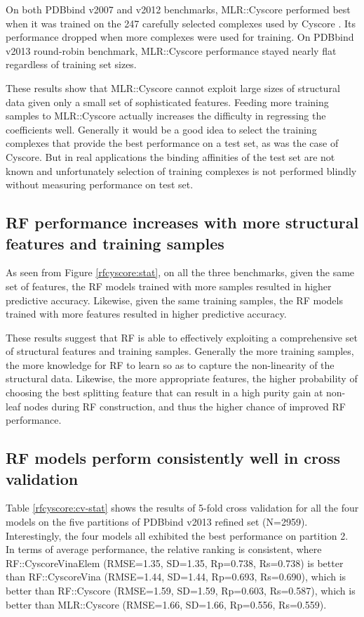 On both PDBbind v2007 and v2012 benchmarks, MLR::Cyscore performed best when it was trained on the 247 carefully selected complexes used by Cyscore \citep{1372}. Its performance dropped when more complexes were used for training. On PDBbind v2013 round-robin benchmark, MLR::Cyscore performance stayed nearly flat regardless of training set sizes.

These results show that MLR::Cyscore cannot exploit large sizes of structural data given only a small set of sophisticated features. Feeding more training samples to MLR::Cyscore actually increases the difficulty in regressing the coefficients well. Generally it would be a good idea to select the training complexes that provide the best performance on a test set, as was the case of Cyscore. But in real applications the binding affinities of the test set are not known and unfortunately selection of training complexes is not performed blindly without measuring performance on test set.

\subsection{RF performance increases with more structural features and training samples}

As seen from Figure \ref{rfcyscore:stat}, on all the three benchmarks, given the same set of features, the RF models trained with more samples resulted in higher predictive accuracy. Likewise, given the same training samples, the RF models trained with more features resulted in higher predictive accuracy.

These results suggest that RF is able to effectively exploiting a comprehensive set of structural features and training samples. Generally the more training samples, the more knowledge for RF to learn so as to capture the non-linearity of the structural data. Likewise, the more appropriate features, the higher probability of choosing the best splitting feature that can result in a high purity gain at non-leaf nodes during RF construction, and thus the higher chance of improved RF performance.

\subsection{RF models perform consistently well in cross validation}

Table \ref{rfcyscore:cv-stat} shows the results of 5-fold cross validation for all the four models on the five partitions of PDBbind v2013 refined set (N=2959). Interestingly, the four models all exhibited the best performance on partition 2. In terms of average performance, the relative ranking is consistent, where RF::CyscoreVinaElem (RMSE=1.35, SD=1.35, Rp=0.738, Rs=0.738) is better than RF::CyscoreVina (RMSE=1.44, SD=1.44, Rp=0.693, Rs=0.690), which is better than RF::Cyscore (RMSE=1.59, SD=1.59, Rp=0.603, Rs=0.587), which is better than MLR::Cyscore (RMSE=1.66, SD=1.66, Rp=0.556, Rs=0.559).

